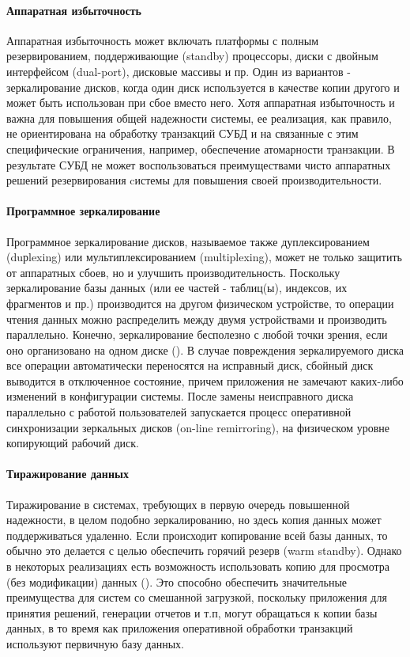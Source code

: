 \paragraph{Аппаратная избыточность}
Аппаратная избыточность может включать платформы с полным резервированием, поддерживающие (standby) процессоры, диски с двойным интерфейсом (dual-port), дисковые массивы и пр. Один из вариантов - зеркалирование дисков, когда один диск используется в качестве копии другого и может быть использован при сбое вместо него. Хотя аппаратная избыточность и важна для повышения общей надежности системы, ее реализация, как правило, не ориентирована на обработку транзакций СУБД и на связанные с этим специфические ограничения, например, обеспечение атомарности транзакции. В результате СУБД не может воспользоваться преимуществами чисто аппаратных решений резервирования cистемы для повышения своей производительности.
\paragraph{Программное зеркалирование} 

Программное зеркалирование дисков, называемое также дуплексированием (duрlexing) или мультиплексированием (multiplexing), может не только защитить от аппаратных сбоев, но и улучшить производительность. Поскольку зеркалирование базы данных (или ее частей - таблиц(ы), индексов, их фрагментов и пр.) производится на другом физическом устройстве, то операции чтения данных можно распределить между двумя устройствами и производить параллельно. Конечно, зеркалирование бесполезно с любой точки зрения, если оно организовано на одном диске (\autocite{Baron}).
В случае повреждения зеркалируемого диска все операции автоматически переносятся на исправный диск, сбойный диск выводится в отключенное состояние, причем приложения не замечают каких-либо изменений в конфигурации системы.
После замены неисправного диска параллельно с работой пользователей запускается процесс оперативной синхронизации зеркальных дисков (on-line remirroring), на физическом уровне копирующий рабочий диск. \\
\paragraph{Тиражирование данных}
Тиражирование в системах, требующих в первую очередь повышенной надежности, в
целом подобно зеркалированию, но здесь копия данных может поддерживаться
удаленно. Если происходит копирование всей базы данных, то обычно это делается с
целью обеспечить горячий резерв (warm standby). Однако в некоторых реализациях
есть возможность использовать копию для просмотра (без модификации) данных (\autocite{Baron}). Это способно обеспечить значительные преимущества для систем со смешанной загрузкой, поскольку приложения для принятия решений, генерации отчетов и т.п,
могут обращаться к копии базы данных, в то время как приложения оперативной обработки транзакций используют первичную базу данных.
